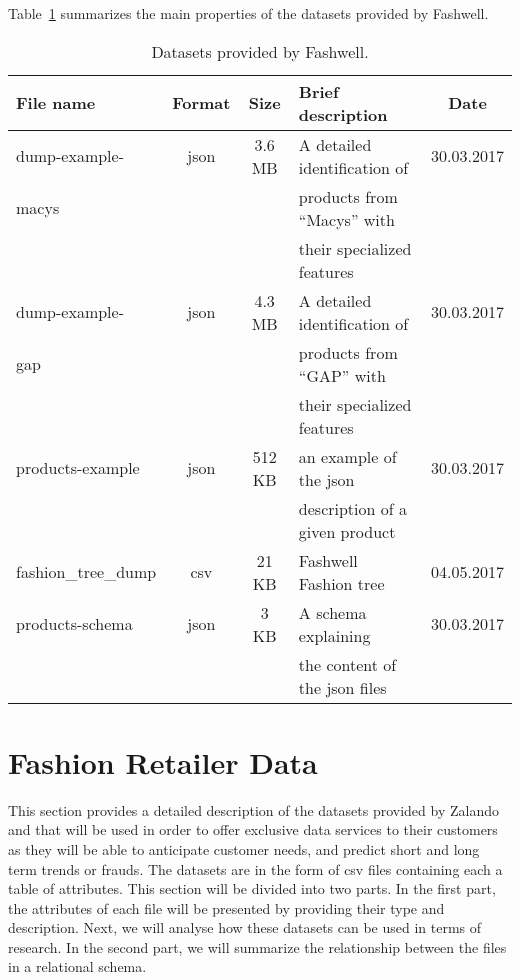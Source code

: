 Table~\ref{tab:data-fashwell} summarizes the main properties of the datasets provided by Fashwell.

\begin{table}[htb]\centering
\def\arraystretch{1.2}
\begin{tabular}{|l|c|c|l|c|}
\hline
 \textbf{File name} & \textbf{Format}  &  \textbf{Size} & \textbf{Brief description} & \textbf{Date} \\
 \hline\hline
dump-example- & json &3.6 MB  &A detailed identification of&  30.03.2017  \\
macys &  &  &  products   from “Macys” with & \\
 &  &  &  their specialized features & \\
\hline 
dump-example- & json & 4.3 MB  &A detailed identification of  &  30.03.2017  \\
gap &  &  & products from “GAP” with & \\
 &  &  & their specialized features & \\
\hline 
products-example & json &512 KB &an example of the json  &  30.03.2017  \\
 &  &  & description of a given product  & \\
\hline 
fashion\_tree\_dump& csv &21 KB  &Fashwell Fashion tree  &  04.05.2017  \\
\hline 
products-schema & json &3 KB  &A schema explaining  &  30.03.2017  \\
 &  &  &  the content of the json files  & \\
\hline 
\end{tabular}
\caption{Datasets provided by Fashwell.}
\label{tab:data-fashwell}
\end{table}

\section{Fashion Retailer Data}

This section provides a detailed description of the datasets provided by Zalando and that will be used in order to offer exclusive data services to their customers as they will be able to  anticipate customer needs, and predict short and long term trends or frauds. The datasets are in the form of csv files containing each a table of attributes.  This section will be divided into two parts. In the first part, the attributes of each file will be presented by providing their type and description. Next, we will analyse how these datasets can be used in terms of research. In the second part, we will summarize the relationship between the files in a relational schema.

